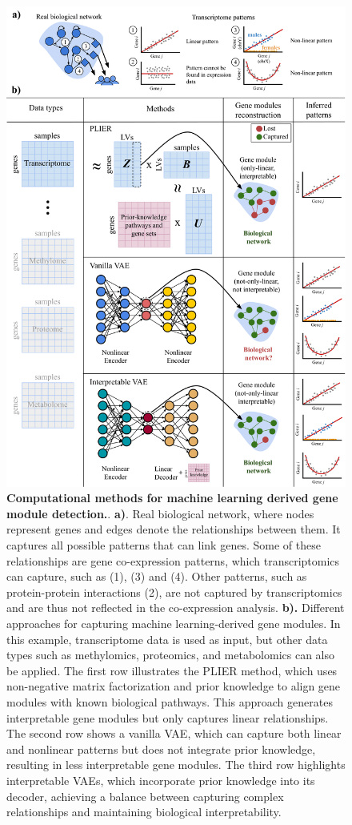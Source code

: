 \begin{figure}
\hypertarget{fig:fig3}{%
\centering
\includegraphics[width=1\textwidth,height=\textheight]{images/fig3.svg}
\caption{\textbf{Computational methods for machine learning derived gene module detection.}.
\textbf{a)}.
Real biological network, where nodes represent genes and edges denote the relationships between them.
It captures all possible patterns that can link genes.
Some of these relationships are gene co-expression patterns, which transcriptomics can capture, such as (1), (3) and (4).
Other patterns, such as protein-protein interactions (2), are not captured by transcriptomics and are thus not reflected in the co-expression analysis.
\textbf{b).} Different approaches for capturing machine learning-derived gene modules.
In this example, transcriptome data is used as input, but other data types such as methylomics, proteomics, and metabolomics can also be applied.
The first row illustrates the PLIER method, which uses non-negative matrix factorization and prior knowledge to align gene modules with known biological pathways.
This approach generates interpretable gene modules but only captures linear relationships.
The second row shows a vanilla VAE, which can capture both linear and nonlinear patterns but does not integrate prior knowledge, resulting in less interpretable gene modules.
The third row highlights interpretable VAEs, which incorporate prior knowledge into its decoder, achieving a balance between capturing complex relationships and maintaining biological interpretability.}\label{fig:fig3}
}
\end{figure}


